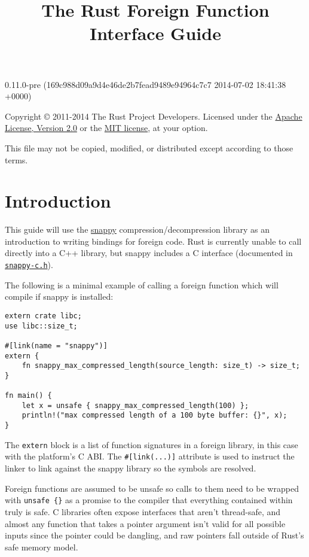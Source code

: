 \documentclass[]{article}
\title{The Rust Foreign Function Interface Guide}
\begin{document}
\maketitle

0.11.0-pre (169c988d09a9d4e46de2b7fead9489e94964c7c7 2014-07-02 18:41:38 +0000)

Copyright © 2011-2014 The Rust Project Developers. Licensed under the
\href{http://www.apache.org/licenses/LICENSE-2.0}{Apache License,
Version 2.0} or the \href{http://opensource.org/licenses/MIT}{MIT
license}, at your option.

This file may not be copied, modified, or distributed except according
to those terms.

{
\hypersetup{linkcolor=black}
\setcounter{tocdepth}{3}
\tableofcontents
}
\section{Introduction}\label{introduction}

This guide will use the \href{https://github.com/google/snappy}{snappy}
compression/decompression library as an introduction to writing bindings
for foreign code. Rust is currently unable to call directly into a C++
library, but snappy includes a C interface (documented in
\href{https://github.com/google/snappy/blob/master/snappy-c.h}{\texttt{snappy-c.h}}).

The following is a minimal example of calling a foreign function which
will compile if snappy is installed:

\begin{verbatim}
extern crate libc;
use libc::size_t;

#[link(name = "snappy")]
extern {
    fn snappy_max_compressed_length(source_length: size_t) -> size_t;
}

fn main() {
    let x = unsafe { snappy_max_compressed_length(100) };
    println!("max compressed length of a 100 byte buffer: {}", x);
}
\end{verbatim}

The \texttt{extern} block is a list of function signatures in a foreign
library, in this case with the platform's C ABI. The
\texttt{\#{[}link(...){]}} attribute is used to instruct the linker to
link against the snappy library so the symbols are resolved.

Foreign functions are assumed to be unsafe so calls to them need to be
wrapped with \texttt{unsafe \{\}} as a promise to the compiler that
everything contained within truly is safe. C libraries often expose
interfaces that aren't thread-safe, and almost any function that takes a
pointer argument isn't valid for all possible inputs since the pointer
could be dangling, and raw pointers fall outside of Rust's safe memory
model.
\end{document}
